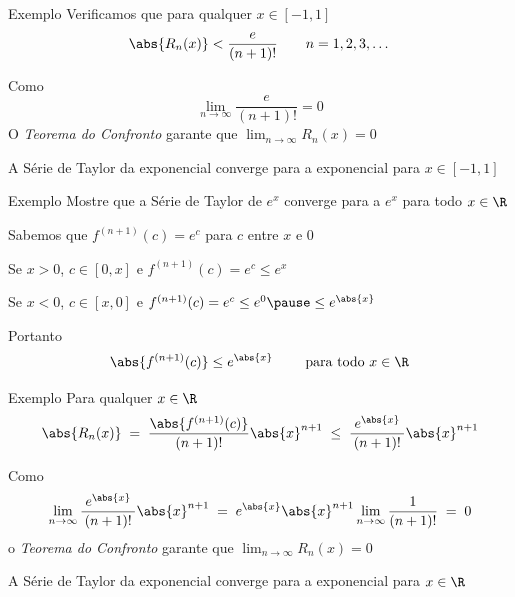 \begin{frame}{Exemplo \theexemplo}
  Verificamos que para qualquer \(x\in[-1, 1]\)
  \[
    \abs{R_n(x)} < \frac{\;e\;}{(n+1)!}
    \qquad
    n = 1, 2, 3, \dots
  \]

  \pause
  Como
  \[
    \lim_{n\to\infty} \frac{\;e\;}{(n+1)!} = 0
  \]
  \pause
  O \emph{Teorema do Confronto} garante que
  \(
    \lim_{n\to\infty} R_n(x) = 0
  \)

  \pause
  A Série de Taylor da exponencial converge para a exponencial para \(x\in[-1, 1]\)
\end{frame}

\addtocounter{exemplo}{1}
\begin{frame}{Exemplo \theexemplo}
  Mostre que a Série de Taylor de \(e^x\) converge para a \(e^x\) para todo
  \(x\in\R\)

  \pause
  \vspace{\baselineskip}
  Sabemos que
  \(
    f^{(n+1)}(c) = e^c
  \)
  para \(c\) entre \(x\) e \(0\)

  \pause
  \vspace{\baselineskip}
  Se \(x>0\), \(c\in[0, x]\)
  \pause
  e \;
  \(
    f^{(n+1)}(c) = e^c \leq e^x
  \)

  \pause
  \vspace{0.5\baselineskip}
  Se \(x<0\), \(c\in[x, 0]\)
  \pause
  e \;
  \(
    f^{(n+1)}(c) = e^c \leq e^0
    \pause
    \leq e^{\abs{x}}
  \)

  \pause
  \vspace{0.5\baselineskip}
  Portanto
  \[
    \abs{f^{(n+1)}(c)} \leq e^{\abs{x}}
    \qquad
    \text{ para todo } x \in \R
  \]
\end{frame}

\begin{frame}{Exemplo \theexemplo}
  Para qualquer \(x\in\R\)
  \[
    \abs{R_n(x)}
    \;=\;    \frac{\abs{f^{(n+1)}(c)}}{(n+1)!}\abs{x}^{n+1}
    \;\leq\; \frac{\;e^{\abs{x}}\;}{(n+1)!}\abs{x}^{n+1}
  \]

  \pause
  Como
  \[
    \lim_{n\to\infty} \frac{\;e^{\abs{x}}\;}{(n+1)!}\abs{x}^{n+1}
    \;=\; e^{\abs{x}} \abs{x}^{n+1} \lim_{n\to\infty} \frac{1}{(n+1)!}
    \;=\; 0
  \]
  \pause
  o \emph{Teorema do Confronto} garante que
  \(
    \lim_{n\to\infty} R_n(x) = 0
  \)

  \pause
  A Série de Taylor da exponencial converge para a exponencial para \(x\in\R\)
\end{frame}


